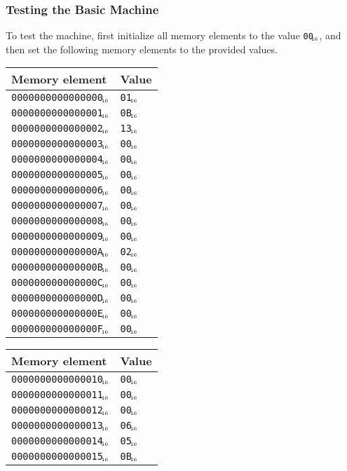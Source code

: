 \documentclass[a4paper,11pt]{article}
\newcommand{\num}[1]{\texttt{#1}\xspace}
\newcommand{\hex}[1]{\num{#1}$_{\textup{\tiny\hskip-1ex 16}}$\xspace}
\begin{document}
\subsubsection{Testing the Basic Machine}

To test the machine, first initialize all memory elements to the value \hex{00}, and then set the following memory elements to the provided values.

\begin{center}
  \begin{tabular}{@{}ll@{}}
    \hline
    Memory element         & Value \\
    \hline
    \hex{0000000000000000} & \hex{01} \\
    \hex{0000000000000001} & \hex{0B} \\
    \hex{0000000000000002} & \hex{13} \\
    \hex{0000000000000003} & \hex{00} \\
    \hex{0000000000000004} & \hex{00} \\
    \hex{0000000000000005} & \hex{00} \\
    \hex{0000000000000006} & \hex{00} \\
    \hex{0000000000000007} & \hex{00} \\
    \hex{0000000000000008} & \hex{00} \\
    \hex{0000000000000009} & \hex{00} \\
    \hex{000000000000000A} & \hex{02} \\
    \hex{000000000000000B} & \hex{00} \\
    \hex{000000000000000C} & \hex{00} \\
    \hex{000000000000000D} & \hex{00} \\
    \hex{000000000000000E} & \hex{00} \\
    \hex{000000000000000F} & \hex{00} \\
    \hline
  \end{tabular}
  \hfil
  \begin{tabular}{@{}ll@{}}
    \hline
    Memory element         & Value \\
    \hline
    \hex{0000000000000010} & \hex{00} \\
    \hex{0000000000000011} & \hex{00} \\
    \hex{0000000000000012} & \hex{00} \\
    \hex{0000000000000013} & \hex{06} \\
    \hex{0000000000000014} & \hex{05} \\
    \hex{0000000000000015} & \hex{0B} \\

\end{tabular}
\end{center}
\end{document}
